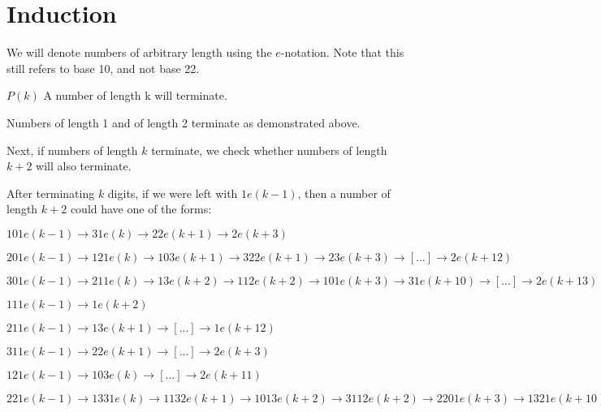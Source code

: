 \documentclass{proc-l}
\theoremstyle{definition}
\theoremstyle{remark}
\numberwithin{equation}{section}
\begin{document}
\section{Induction}

We will denote numbers of arbitrary length using the $e$-notation. Note that this still refers to base 10, and not base 22.

$P(k)$ A number of length k will terminate.

Numbers of length 1 and of length 2 terminate as demonstrated above.

Next, if numbers of length $k$ terminate, we check whether numbers of length $k+2$ will also terminate.

After terminating $k$ digits, if we were left with $1e(k-1)$, then a number of length $k+2$ could have one of the forms:

$101e(k-1) \rightarrow 31e(k) \rightarrow 22e(k+1) \rightarrow 2e(k+3)$

$201e(k-1) \rightarrow 121e(k) \rightarrow 103e(k+1) \rightarrow 322e(k+1) \rightarrow 23e(k+3) \rightarrow [...] \rightarrow 2e(k+12)$

$301e(k-1) \rightarrow 211e(k) \rightarrow 13e(k+2) \rightarrow 112e(k+2) \rightarrow 101e(k+3) \rightarrow 31e(k+10) \rightarrow [...] \rightarrow 2e(k+13)$

$111e(k-1) \rightarrow 1e(k+2)$

$211e(k-1) \rightarrow 13e(k+1) \rightarrow [...] \rightarrow 1e(k+12)$

$311e(k-1) \rightarrow 22e(k+1) \rightarrow [...] \rightarrow 2e(k+3)$

$121e(k-1) \rightarrow 103e(k) \rightarrow [...] \rightarrow 2e(k+11)$

$221e(k-1) \rightarrow 1331e(k) \rightarrow 1132e(k+1) \rightarrow 1013e(k+2) \rightarrow 3112e(k+2) \rightarrow 2201e(k+3) \rightarrow 1321e(k+10) \rightarrow 1123e(k+11) \rightarrow 10102e(k+11) \rightarrow 3032e(k+12) \rightarrow 2123e(k+13) \rightarrow 13102e(k+13) \rightarrow 11132e(k+20) \rightarrow 10013e(k+21) \rightarrow 30112e(k+21) \rightarrow 21101e(k+22) \rightarrow 12331e(k+23) \rightarrow 11032e(k+30) \rightarrow 3323e(k+31) \rightarrow 23302e(k+31) \rightarrow 20312e(k+32) \rightarrow 12221e(k+33) \rightarrow 10333e(k+100) \rightarrow 32332e(k+100) \rightarrow 21033e(k+101) \rightarrow 123232e(k+102) \rightarrow 110202e(k+103) \rightarrow 33132e(k+110) \rightarrow 23212e(k+111) \rightarrow 20231e(k+112) \rightarrow 12202e(k+113) \rightarrow 1322e(k+120) \rightarrow 113e(k+122) \rightarrow 1012e(k+122) \rightarrow 311e(k+123) \rightarrow 22e(k+131) \rightarrow 2e(k+133)$
\end{document}
